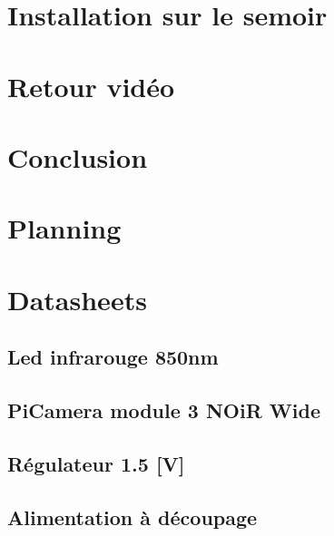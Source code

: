 \documentclass[
    iai, %
    eai, %
]{heig-tb}
\begin{document}
\chapter{Installation sur le semoir}


\chapter{Retour vidéo}


\chapter{Conclusion}


\clearpage
\printbibliography

\appendix
\appendixpage
\addappheadtotoc

\chapter{Planning \label{planning}}
\chapter{Datasheets}
\section{Led infrarouge 850nm}

\section{PiCamera module 3 NOiR Wide}


\section{Régulateur 1.5 [V]}


\section{Alimentation à découpage}

\end{document}
